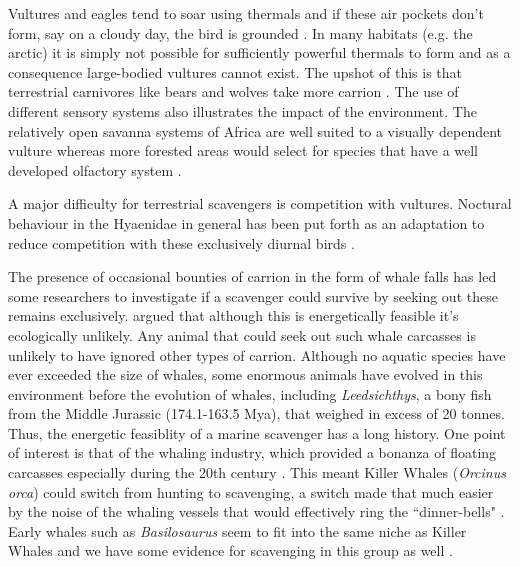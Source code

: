 \documentclass[a4paper,12pt]{article}
\begin{document}
Vultures and eagles tend to soar using thermals and if these air pockets don't form, say on a cloudy day, the bird is grounded \citep{mundy1992vultures}.
In many habitats (e.g. the arctic) it is simply not possible for sufficiently powerful thermals to form and as a consequence large-bodied vultures cannot exist.
The upshot of this is that terrestrial carnivores like bears and wolves take more carrion \citep{devault2003scavenging}.
The use of different sensory systems also illustrates the impact of the environment. 
The relatively open savanna systems of Africa are well suited to a visually dependent vulture whereas more forested areas would select for species that have a well developed olfactory system  \citep{houston1986olfaction}. 

A major difficulty for terrestrial scavengers is competition with vultures.
Noctural behaviour in the Hyaenidae in general has been put forth as an adaptation to reduce competition with these exclusively diurnal birds \citep{gittleman2013carnivore}.


The presence of occasional bounties of carrion in the form of whale falls has led some researchers to investigate if a scavenger could survive by seeking out these remains exclusively.
\cite{ruxton2005searching} argued that although this is energetically feasible it's ecologically unlikely.
Any animal that could seek out such whale carcasses is unlikely to have ignored other types of carrion.
Although no aquatic species have ever exceeded the size of whales, some enormous animals have evolved in this environment before the evolution of whales, including \textit{Leedsichthys}, a bony fish from the Middle Jurassic (174.1-163.5 Mya), that weighed in excess of 20 tonnes.
Thus, the energetic feasiblity of a marine scavenger has a long history.
One point of interest is that of the whaling industry, which provided a bonanza of floating carcasses especially during the 20th century \citep{Whitehead415}.
This meant Killer Whales (\textit{Orcinus orca}) could switch from hunting to scavenging, a switch made that much easier by the noise of the whaling vessels that would effectively ring the ``dinner-bells" \citep{Whitehead415}.
Early whales such as \textit{Basilosaurus} seem to fit into the same niche as Killer Whales and we have some evidence for scavenging in this group as well \citep{fahlke2012bite}.
\end{document}
